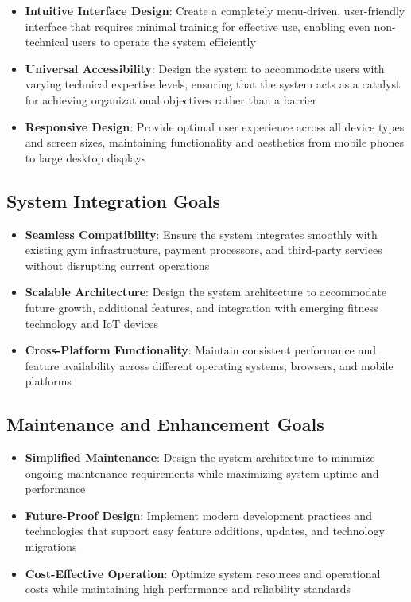\documentclass[12pt,a4paper]{report}
\begin{document}
\begin{itemize}[leftmargin=*]
    \item \textbf{Intuitive Interface Design}: Create a completely menu-driven, user-friendly interface that requires minimal training for effective use, enabling even non-technical users to operate the system efficiently
    \item \textbf{Universal Accessibility}: Design the system to accommodate users with varying technical expertise levels, ensuring that the system acts as a catalyst for achieving organizational objectives rather than a barrier
    \item \textbf{Responsive Design}: Provide optimal user experience across all device types and screen sizes, maintaining functionality and aesthetics from mobile phones to large desktop displays
\end{itemize}

\subsection{System Integration Goals}

\begin{itemize}[leftmargin=*]
    \item \textbf{Seamless Compatibility}: Ensure the system integrates smoothly with existing gym infrastructure, payment processors, and third-party services without disrupting current operations
    \item \textbf{Scalable Architecture}: Design the system architecture to accommodate future growth, additional features, and integration with emerging fitness technology and IoT devices
    \item \textbf{Cross-Platform Functionality}: Maintain consistent performance and feature availability across different operating systems, browsers, and mobile platforms
\end{itemize}

\subsection{Maintenance and Enhancement Goals}

\begin{itemize}[leftmargin=*]
    \item \textbf{Simplified Maintenance}: Design the system architecture to minimize ongoing maintenance requirements while maximizing system uptime and performance
    \item \textbf{Future-Proof Design}: Implement modern development practices and technologies that support easy feature additions, updates, and technology migrations
    \item \textbf{Cost-Effective Operation}: Optimize system resources and operational costs while maintaining high performance and reliability standards
\end{itemize}
\end{document}
